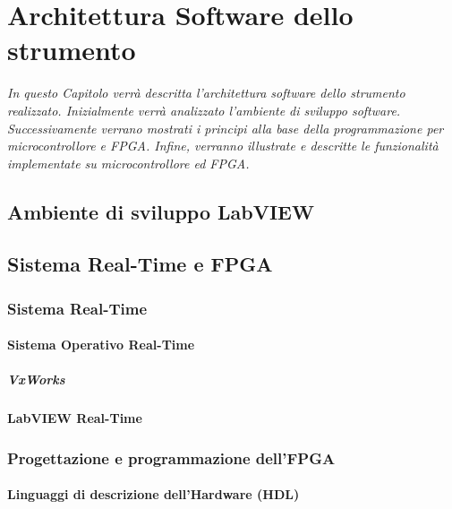 \chapter{Architettura Software dello strumento}
\label{capitolo4}
\thispagestyle{empty}

\textit{In questo Capitolo verrà descritta l’architettura software dello strumento realizzato. Inizialmente verrà analizzato l’ambiente di sviluppo software. Successivamente verrano mostrati i principi alla base della programmazione per microcontrollore e FPGA. Infine, verranno illustrate e descritte le funzionalità implementate su microcontrollore ed FPGA.}

\section{Ambiente di sviluppo LabVIEW}
\section{Sistema Real-Time e FPGA}

	\subsection{Sistema Real-Time}

		\subsubsection{Sistema Operativo Real-Time}

			\paragraph{VxWorks}

		\subsubsection{LabVIEW Real-Time}

	\subsection{Progettazione e programmazione dell'FPGA}
		
		\subsubsection{Linguaggi di descrizione dell'Hardware (HDL)}
		
